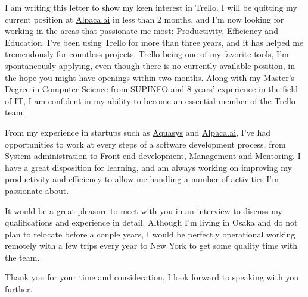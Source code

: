 \documentclass[10pt,stdletter,dateno,sigleft]{newlfm} %
\begin{document}
\begin{newlfm}


I am writing this letter to show my keen interest in Trello. I will be
quitting my current position at \href{https://www.alpaca.ai/}{Alpaca.ai}
in less than 2 months, and I'm now looking for working in the areas that
passionate me most: Productivity, Efficiency and Education. I've been using
Trello for more than three years, and it has helped me tremendously for
countless projects. Trello being one of my favorite tools, I'm spontaneously
applying, even though there is no currently available position, in the hope you
might have openings within two months.  Along with my
Master's Degree in Computer Science from SUPINFO and 8 years' experience in the
field of IT, I am confident in my ability to become an essential member of the
Trello team.

From my experience in startups such as
\href{http://www.aquasys.co.jp/}{Aquasys} and
\href{https://www.alpaca.ai/}{Alpaca.ai}, I've had opportunities to work at
every steps of a software development process, from System administration to
Front-end development, Management and Mentoring. I have a great disposition for
learning, and am always working on improving my productivity and efficiency to
allow me handling a number of activities I'm passionate about. 

It would be a great pleasure to meet with you in an interview to discuss my
qualifications and experience in detail. Although I'm living in Osaka and do not
plan to relocate before a couple years, I would be perfectly operational working
remotely with a few trips every year to New York to get some quality time with
the team.

Thank you for your time and consideration, I look forward to speaking with you
further.


\end{newlfm}
\end{document}
